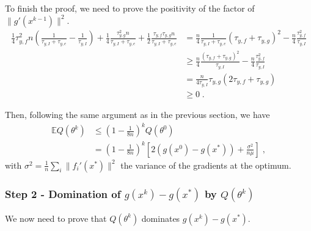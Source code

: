 \documentclass{article}
\def\E{_{\scriptscriptstyle E}}
\def \E{{\mathbb E}}
\def \E{{\mathbb E}}
\begin{document}
To finish the proof, we need to prove the positivity of the factor of $\|g'(x^{k-1}) \|^2$.
\begin{align*}
\frac{1}{4}\tau_{y, f}^2n\left(\frac{1}{\tau_{y,I} + \tau_{y,e}} - \frac{1}{\tau_{y,I}}\right) + \frac{1}{4}\frac{\tau_{y,g}^2n}{\tau_{y,I} + \tau_{y,e}} + \frac{1}{2}\frac{\tau_{y,f}\tau_{y,g}n}{\tau_{y,I} + \tau_{y,e}}& = \frac{n}{4}\frac{1}{\tau_{y,I} + \tau_{y,e}}(\tau_{y, f} + \tau_{y,g})^2 - \frac{n}{4}\frac{\tau_{y, f}^2}{\tau_{y,I}}\\
&\geqslant \frac{n}{4}\frac{(\tau_{y, f} + \tau_{y,g})^2}{\tau_{y,I}} - \frac{n}{4}\frac{\tau_{y, f}^2}{\tau_{y,I}}\\
&= \frac{n}{4\tau_{y,I}} \tau_{y,g}(2\tau_{y, f} + \tau_{y,g})\\
&\geqslant 0 \; .
\end{align*}

Then, following the same argument as in the previous section, we have
\begin{align*}
\E Q(\theta^k) 	&\leqslant \left(1 - \frac{1}{8n}\right)^k Q(\theta^0)\\
& = \left(1 - \frac{1}{8n}\right)^k \left[2(g(x^0) - g(x^\ast)) + \frac{\sigma^2}{n\mu}\right] \; ,
\end{align*}
with $\sigma^2 = \frac{1}{n} \sum_i \|f_i'(x^\ast)\|^2$ the variance of the gradients at the optimum.

\subsubsection*{Step 2 - Domination of $g(x^k) - g(x^\ast)$ by $Q(\theta^k)$}

We now need to prove that $Q(\theta^k)$ dominates $g(x^k) - g(x^\ast)$.
\end{document}
